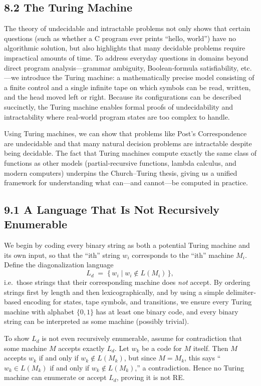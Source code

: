 \documentclass{article}
\begin{document}
\subsection*{8.2 The Turing Machine}
The theory of undecidable and intractable problems not only shows that certain questions (such as whether a C program ever prints “hello, world”) have no algorithmic solution, but also highlights that many decidable problems require impractical amounts of time. To address everyday questions in domains beyond direct program analysis—grammar ambiguity, Boolean‐formula satisfiability, etc.—we introduce the Turing machine: a mathematically precise model consisting of a finite control and a single infinite tape on which symbols can be read, written, and the head moved left or right. Because its configurations can be described succinctly, the Turing machine enables formal proofs of undecidability and intractability where real‐world program states are too complex to handle.

Using Turing machines, we can show that problems like Post’s Correspondence are undecidable and that many natural decision problems are intractable despite being decidable. The fact that Turing machines compute exactly the same class of functions as other models (partial‐recursive functions, lambda calculus, and modern computers) underpins the Church–Turing thesis, giving us a unified framework for understanding what can—and cannot—be computed in practice.

\newpage

\subsection*{9.1 A Language That Is Not Recursively Enumerable}
We begin by coding every binary string as both a potential Turing machine and its own input, so that the “ith” string $w_i$ corresponds to the “ith” machine $M_i$.  Define the diagonalization language  
\[
L_d \;=\;\{\,w_i \mid w_i\notin L(M_i)\,\},
\]
i.e.\ those strings that their corresponding machine does \emph{not} accept.  By ordering strings first by length and then lexicographically, and by using a simple delimiter‐based encoding for states, tape symbols, and transitions, we ensure every Turing machine with alphabet $\{0,1\}$ has at least one binary code, and every binary string can be interpreted as some machine (possibly trivial).

To show $L_d$ is not even recursively enumerable, assume for contradiction that some machine $M$ accepts exactly $L_d$.  Let $w_k$ be a code for $M$ itself.  Then $M$ accepts $w_k$ if and only if $w_k\notin L(M_k)$, but since $M=M_k$, this says “$w_k\in L(M_k)$ if and only if $w_k\notin L(M_k)$,” a contradiction.  Hence no Turing machine can enumerate or accept $L_d$, proving it is not RE.  
\end{document}
